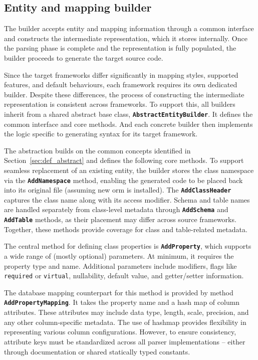\subsection{Entity and mapping builder}

The builder accepts entity and mapping information through a common interface and constructs the intermediate representation, which it stores internally. Once the parsing phase is complete and the representation is fully populated, the builder proceeds to generate the target source code.

Since the target frameworks differ significantly in mapping styles, supported features, and default behaviours, each framework requires its own dedicated builder. Despite these differences, the process of constructing the intermediate representation is consistent across frameworks. To support this, all builders inherit from a shared abstract base class, \texttt{\textbf{AbstractEntityBuilder}}. It defines the common interface and core methods. And each concrete builder then implements the logic specific to generating syntax for its target framework.

The abstraction builds on the common concepts identified in Section~\ref{sec:def_abstract} and defines the following core methods. To support seamless replacement of an existing entity, the builder stores the class namespace via the \texttt{\textbf{AddNamespace}} method, enabling the generated code to be placed back into its original file (assuming new \acrshort{orm} is installed). The \texttt{\textbf{AddClassHeader}} captures the class name along with its access modifier. 
Schema and table names are handled separately from class-level metadata through \texttt{\textbf{AddSchema}} and \texttt{\textbf{AddTable}} methods, as their placement may differ across source frameworks. Together, these methods provide coverage for class and table-related metadata. 

The central method for defining class properties is \texttt{\textbf{AddProperty}}, which supports a wide range of (mostly optional) parameters. At minimum, it requires the property type and name. Additional parameters include modifiers, flags like \texttt{required} or \texttt{virtual}, nullability, default value, and getter/setter information. 

The database mapping counterpart for this method is provided by method \texttt{\textbf{AddPropertyMapping}}. It takes the property name and a hash map of column attributes. These attributes may include data type, length, scale, precision, and any other column-specific metadata. The use of hashmap provides flexibility in representing various column configurations. However, to ensure consistency, attribute keys must be standardized across all parser implementations -- either through documentation or shared statically typed constants.

